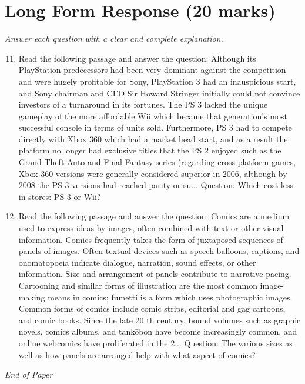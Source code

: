 \documentclass[12pt]{article}
\begin{document}
\section*{Long Form Response (20 marks)}
\textit{Answer each question with a clear and complete explanation.}
\begin{enumerate}[label=\arabic*.]
\setcounter{enumi}{10}
\item Read the following passage and answer the question: Although its PlayStation predecessors had been very dominant against the competition and were hugely profitable for Sony, PlayStation 3 had an inauspicious start, and Sony chairman and CEO Sir Howard Stringer initially could not convince investors of a turnaround in its fortunes. The PS 3 lacked the unique gameplay of the more affordable Wii which became that generation's most successful console in terms of units sold. Furthermore, PS 3 had to compete directly with Xbox 360 which had a market head start, and as a result the platform no longer had exclusive titles that the PS 2 enjoyed such as the Grand Theft Auto and Final Fantasy series (regarding cross-platform games, Xbox 360 versions were generally considered superior in 2006, although by 2008 the PS 3 versions had reached parity or su... Question: Which cost less in stores: PS 3 or Wii?
\item Read the following passage and answer the question: Comics are a medium used to express ideas by images, often combined with text or other visual information. Comics frequently takes the form of juxtaposed sequences of panels of images. Often textual devices such as speech balloons, captions, and onomatopoeia indicate dialogue, narration, sound effects, or other information. Size and arrangement of panels contribute to narrative pacing. Cartooning and similar forms of illustration are the most common image-making means in comics; fumetti is a form which uses photographic images. Common forms of comics include comic strips, editorial and gag cartoons, and comic books. Since the late 20 th century, bound volumes such as graphic novels, comics albums, and tankōbon have become increasingly common, and online webcomics have proliferated in the 2... Question: The various sizes as well as how panels are arranged help with what aspect of comics?
\end{enumerate}

\vfill
\noindent\textit{End of Paper}
\end{document}
